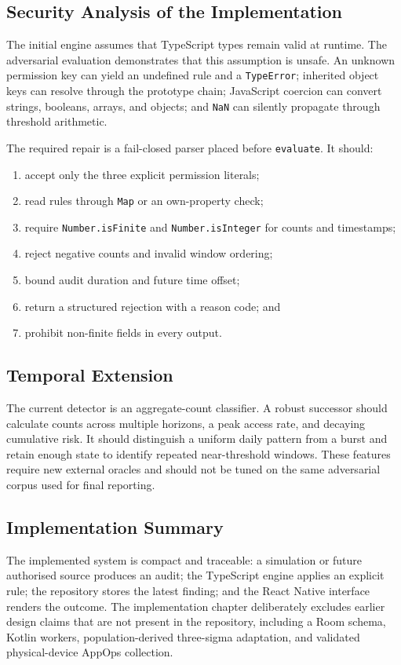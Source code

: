 \subsection{Security Analysis of the Implementation}

The initial engine assumes that TypeScript types remain valid at runtime. The adversarial evaluation demonstrates that this assumption is unsafe. An unknown permission key can yield an undefined rule and a \texttt{TypeError}; inherited object keys can resolve through the prototype chain; JavaScript coercion can convert strings, booleans, arrays, and objects; and \texttt{NaN} can silently propagate through threshold arithmetic.

The required repair is a fail-closed parser placed before \texttt{evaluate}. It should:

\begin{enumerate}
    \item accept only the three explicit permission literals;
    \item read rules through \texttt{Map} or an own-property check;
    \item require \texttt{Number.isFinite} and \texttt{Number.isInteger} for counts and timestamps;
    \item reject negative counts and invalid window ordering;
    \item bound audit duration and future time offset;
    \item return a structured rejection with a reason code; and
    \item prohibit non-finite fields in every output.
\end{enumerate}

\subsection{Temporal Extension}

The current detector is an aggregate-count classifier. A robust successor should calculate counts across multiple horizons, a peak access rate, and decaying cumulative risk. It should distinguish a uniform daily pattern from a burst and retain enough state to identify repeated near-threshold windows. These features require new external oracles and should not be tuned on the same adversarial corpus used for final reporting.

\subsection{Implementation Summary}

The implemented system is compact and traceable: a simulation or future authorised source produces an audit; the TypeScript engine applies an explicit rule; the repository stores the latest finding; and the React Native interface renders the outcome. The implementation chapter deliberately excludes earlier design claims that are not present in the repository, including a Room schema, Kotlin workers, population-derived three-sigma adaptation, and validated physical-device AppOps collection.
